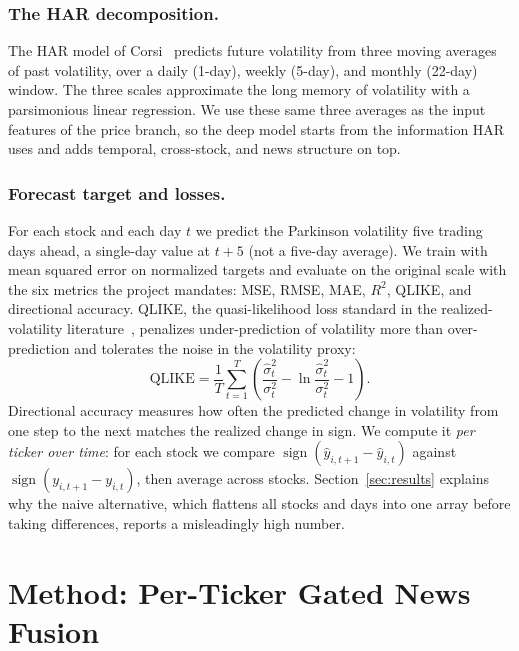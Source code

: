 \documentclass[runningheads]{llncs}
\begin{document}
\subsubsection{The HAR decomposition.}
The HAR model of Corsi~\cite{corsi2009} predicts future volatility from three moving averages of
past volatility, over a daily (1-day), weekly (5-day), and monthly (22-day) window. The three
scales approximate the long memory of volatility with a parsimonious linear regression. We use
these same three averages as the input features of the price branch, so the deep model starts from
the information HAR uses and adds temporal, cross-stock, and news structure on top.

\subsubsection{Forecast target and losses.}
For each stock and each day $t$ we predict the Parkinson volatility five trading days ahead, a
single-day value at $t+5$ (not a five-day average). We train with mean squared error on
normalized targets and evaluate on the original scale with the six metrics the project mandates:
MSE, RMSE, MAE, $R^2$, QLIKE, and directional accuracy. QLIKE, the quasi-likelihood loss standard
in the realized-volatility literature~\cite{patton2011}, penalizes under-prediction of volatility
more than over-prediction and tolerates the noise in the volatility proxy:
\begin{equation}
\text{QLIKE} = \frac{1}{T}\sum_{t=1}^{T}\left(\frac{\hat{\sigma}^2_t}{\sigma^2_t}
 - \ln\frac{\hat{\sigma}^2_t}{\sigma^2_t} - 1\right).
\label{eq:qlike}
\end{equation}
Directional accuracy measures how often the predicted change in volatility from one step to the
next matches the realized change in sign. We compute it \emph{per ticker over time}: for each
stock we compare $\operatorname{sign}(\hat{y}_{i,t+1}-\hat{y}_{i,t})$ against
$\operatorname{sign}(y_{i,t+1}-y_{i,t})$, then average across stocks. Section~\ref{sec:results}
explains why the naive alternative, which flattens all stocks and days into one array before taking
differences, reports a misleadingly high number.

\section{Method: Per-Ticker Gated News Fusion}
\label{sec:method}
\end{document}
